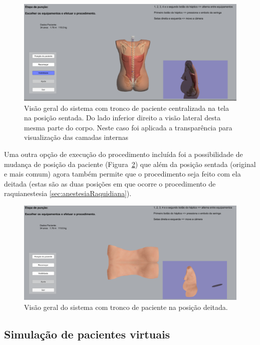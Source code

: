 \begin{figure}[ht!]
    \centering
    \includegraphics[width=0.9\linewidth]{capitulos/figuras/sistema posicao sentada com transparencia.png} 
    \caption{Visão geral do sistema com tronco de paciente centralizada na tela na posição sentada. Do lado inferior direito a visão lateral desta mesma parte do corpo. Neste caso foi aplicada a transparência para visualização das camadas internas}
    \label{fig:posicaoSentadaComTransparencia}
\end{figure}

Uma outra opção de execução do procedimento incluída foi a possibilidade de mudança de posição da paciente (Figura~\ref{fig:posicaoDeitada}) que além da posição sentada (original e mais comum) agora também permite que o procedimento seja feito com ela deitada (estas são as duas posições em que ocorre o procedimento de raquianestesia \ref{sec:anestesiaRaquidiana}).

\begin{figure}[ht!]
    \centering
    \includegraphics[width=0.9\linewidth]{capitulos/figuras/sistema posicao deitada.png} 
    \caption{Visão geral do sistema com tronco de paciente na posição deitada.}
    \label{fig:posicaoDeitada}
\end{figure}

\subsection {Simulação de pacientes virtuais} 
\label{sec:SimulacaoPacientesVirtuais}

